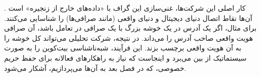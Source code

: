 کار اصلی این شرکت‌ها، غنی‌سازی این گراف با «داده‌های خارج از زنجیره» است \cite{narayanan_deanonymizing}. آن‌ها نقاط اتصال دنیای دیجیتال و دنیای واقعی (مانند صرافی‌ها) را شناسایی می‌کنند. برای مثال، اگر یک آدرس در یک خوشه بزرگ با یک صرافی در تعامل باشد، آن صرافی هویت واقعی صاحب آدرس را می‌داند. در نتیجه، شرکت تحلیلی می‌تواند کل خوشه را به آن هویت واقعی برچسب بزند. این فرآیند، شبه‌ناشناسی بیت‌کوین را به صورت سیستماتیک از بین می‌برد و اینجاست که نیاز به راهکارهای فعالانه برای حفظ حریم خصوصی، که در فصل بعد به آن‌ها می‌پردازیم، آشکار می‌شود.